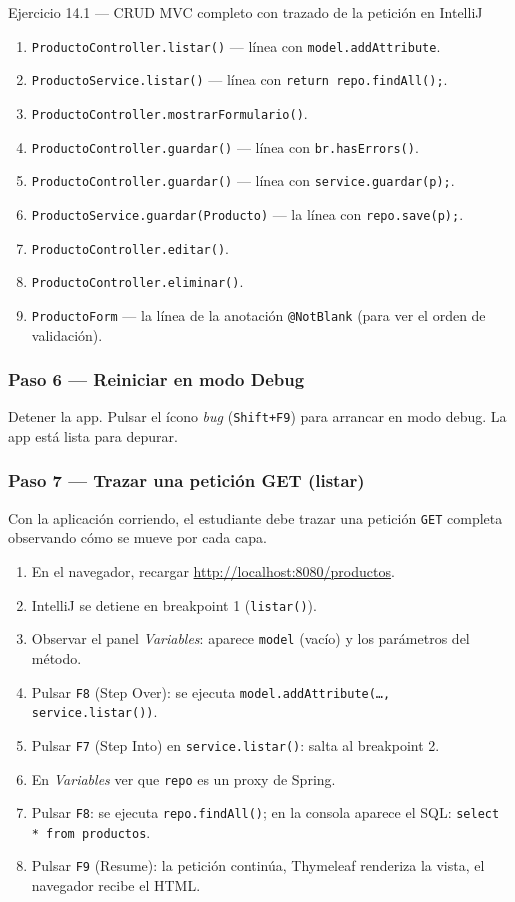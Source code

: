\begin{cajaejercicio}{Ejercicio 14.1 --- CRUD MVC completo con trazado de la petición en IntelliJ}
\begin{enumerate}
\item \texttt{ProductoController.listar()} --- línea con
\texttt{model.addAttribute}.
\item \texttt{ProductoService.listar()} --- línea con
\texttt{return repo.findAll();}.
\item \texttt{ProductoController.mostrarFormulario()}.
\item \texttt{ProductoController.guardar()} --- línea con
\texttt{br.hasErrors()}.
\item \texttt{ProductoController.guardar()} --- línea con
\texttt{service.guardar(p);}.
\item \texttt{ProductoService.guardar(Producto)} --- la línea con
\texttt{repo.save(p);}.
\item \texttt{ProductoController.editar()}.
\item \texttt{ProductoController.eliminar()}.
\item \texttt{ProductoForm} --- la línea de la anotación
\texttt{@NotBlank} (para ver el orden de validación).
\end{enumerate}

\subsubsection*{Paso 6 --- Reiniciar en modo Debug}

Detener la app. Pulsar el ícono \emph{bug} (\texttt{Shift+F9}) para
arrancar en modo debug. La app está lista para depurar.

\subsubsection*{Paso 7 --- Trazar una petición GET (listar)}

Con la aplicación corriendo, el estudiante debe trazar una
petición \texttt{GET} completa observando cómo se mueve por cada
capa.


\begin{enumerate}
\item En el navegador, recargar
\url{http://localhost:8080/productos}.
\item IntelliJ se detiene en breakpoint 1 (\texttt{listar()}).
\item Observar el panel \emph{Variables}: aparece \texttt{model}
(vacío) y los parámetros del método.
\item Pulsar \texttt{F8} (Step Over): se ejecuta
\texttt{model.addAttribute(\dots, service.listar())}.
\item Pulsar \texttt{F7} (Step Into) en \texttt{service.listar()}:
salta al breakpoint 2.
\item En \emph{Variables} ver que \texttt{repo} es un proxy de Spring.
\item Pulsar \texttt{F8}: se ejecuta \texttt{repo.findAll()};
en la consola aparece el SQL: \texttt{select * from productos}.
\item Pulsar \texttt{F9} (Resume): la petición continúa, Thymeleaf
renderiza la vista, el navegador recibe el HTML.
\end{enumerate}


\end{cajaejercicio}
